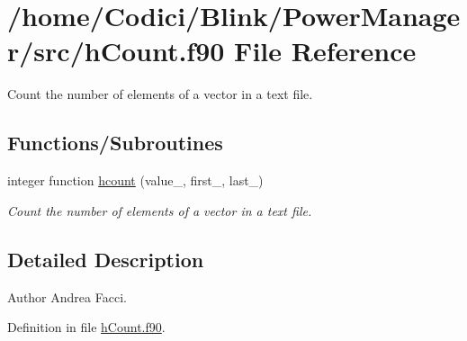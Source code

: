 \hypertarget{h_count_8f90}{\section{/home/\-Codici/\-Blink/\-Power\-Manager/src/h\-Count.f90 File Reference}
\label{h_count_8f90}
}


Count the number of elements of a vector in a text file.  


\subsection*{Functions/\-Subroutines}
\begin{DoxyCompactItemize}
\item 
integer function \hyperlink{h_count_8f90_aabd14fa726542746b1102412257a55c6}{hcount} (value\-\_\-, first\-\_\-, last\-\_\-)
\begin{DoxyCompactList}\small\item\em Count the number of elements of a vector in a text file. \end{DoxyCompactList}\end{DoxyCompactItemize}


\subsection{Detailed Description}
\begin{DoxyAuthor}{Author}
Andrea Facci. 
\end{DoxyAuthor}


Definition in file \hyperlink{h_count_8f90_source}{h\-Count.\-f90}.



